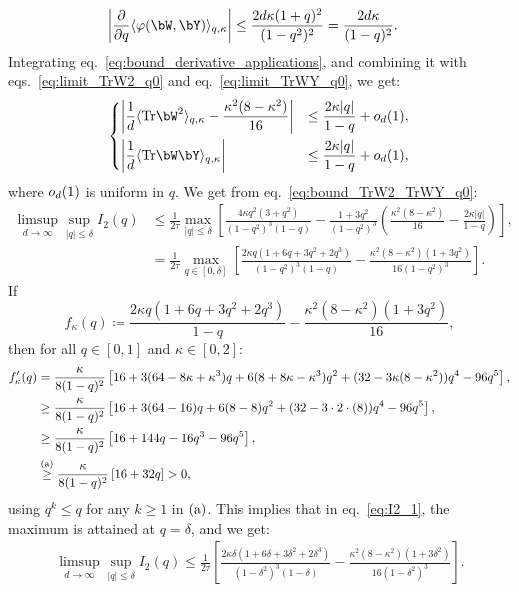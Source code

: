 \begin{align}\label{eq:bound_derivative_applications}
    \left|\frac{\partial}{\partial q} \langle \varphi(\bW, \bY)\rangle_{q,\kappa}\right| 
    &\leq \frac{2 d \kappa (1+q)^2}{(1-q^2)^2} = \frac{2 d \kappa}{(1-q)^2}.
\end{align}
Integrating eq.~\eqref{eq:bound_derivative_applications}, and combining it with eqs.~\eqref{eq:limit_TrW2_q0} and eq.~\eqref{eq:limit_TrWY_q0}, we get:
\begin{align}\label{eq:bound_TrW2_TrWY_q0}
    \begin{dcases}
        \left|\frac{1}{d}\langle\Tr \bW^2\rangle_{q, \kappa} - \frac{\kappa^2 (8-\kappa^2)}{16} \right| &\leq \frac{2\kappa |q|}{1-q}  + \smallO_d(1), \\
        \left|\frac{1}{d}\langle\Tr \bW \bY\rangle_{q, \kappa} \right| &\leq \frac{2\kappa |q|}{1-q}  + \smallO_d(1),
    \end{dcases}
\end{align}
where $o_d(1)$ is uniform in $q$.
We get from eq.~\eqref{eq:bound_TrW2_TrWY_q0}: 
\begin{align}
    \label{eq:I2_1}
    \nonumber
    \limsup_{d \to \infty}\sup_{|q| \leq \delta} I_2(q) &\leq 
    \frac{1}{2\tau} \max_{|q| \leq \delta }\left[
        \frac{4 \kappa q^2(3+q^2)}{(1-q^2)^3(1-q)} - \frac{1+3q^2}{(1-q^2)^3} \left(\frac{\kappa^2(8 - \kappa^2)}{16} - \frac{2\kappa |q|}{1-q}\right)
    \right], \\ 
    &= 
    \frac{1}{2\tau} \max_{q \in [0, \delta]}\left[
        \frac{2 \kappa q(1+6q+3q^2+2q^3)}{(1-q^2)^3(1-q)} - \frac{\kappa^2 (8-\kappa^2)(1+3q^2)}{16 (1-q^2)^3}
    \right].
\end{align}
If 
\begin{equation*}
f_\kappa(q) \coloneqq \frac{2 \kappa q(1+6q+3q^2+2q^3)}{1-q} -  \frac{\kappa^2 (8-\kappa^2)(1+3q^2)}{16},
\end{equation*}
then for all $q \in [0,1]$ and $\kappa \in [0,2]$:
\begin{align}\label{eq:fprime_q}
    \nonumber
    f_\kappa'(q) &= \frac{\kappa}{8(1-q)^2} \left[16 + 3(64-8\kappa+\kappa^3)q + 6(8+8\kappa-\kappa^3)q^2 + (32-3\kappa(8-\kappa^2))q^4 - 96 q^5\right], \\ 
    \nonumber
    &\geq \frac{\kappa}{8(1-q)^2} \left[16 + 3(64-16)q + 6(8-8)q^2 + (32-3\cdot 2 \cdot(8))q^4 - 96 q^5\right], \\ 
    \nonumber
    &\geq \frac{\kappa}{8(1-q)^2} \left[16+144q-16q^3-96q^5\right], \\ 
    &\overset{\mathrm{(a)}}{\geq} \frac{\kappa}{8(1-q)^2} \left[16+32q\right] > 0,
\end{align}
using $q^k \leq q$ for any $k \geq 1$ in $(\rm a)$.
This implies that in eq.~\eqref{eq:I2_1}, the maximum is attained at $q = \delta$, and we get:
\begin{align}\label{eq:ub_I2}
    \limsup_{d \to \infty} \sup_{|q| \leq \delta} I_2(q) 
    \leq
    \frac{1}{2\tau} \left[
        \frac{2 \kappa \delta(1+6\delta+3\delta^2+2\delta^3)}{(1-\delta^2)^3(1-\delta)} - \frac{\kappa^2 (8-\kappa^2)(1+3\delta^2)}{16 (1-\delta^2)^3}
    \right].
\end{align}


